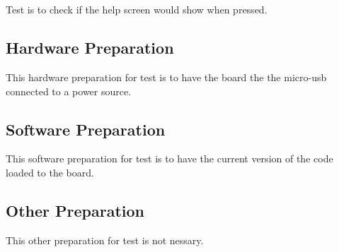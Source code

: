 
\section{\StsTestID}
\label{loc:Prep\StsTestID}


Test \StsTestID{} is to check if the help screen would show when pressed.

\subsection{Hardware Preparation}
\label{loc:HardwarePrep\StsTestID}


This hardware preparation for test \StsTestID{} is to have the board the the micro-usb connected to a power source.

\subsection{Software Preparation}
\label{loc:SoftwarePrep\StsTestID}


This software preparation for test \StsTestID{} is to have the current version of the code loaded to the board.

\subsection{Other Preparation}
\label{loc:OtherPrep\StsTestID}


This other preparation for test \StsTestID{} is not nessary.
